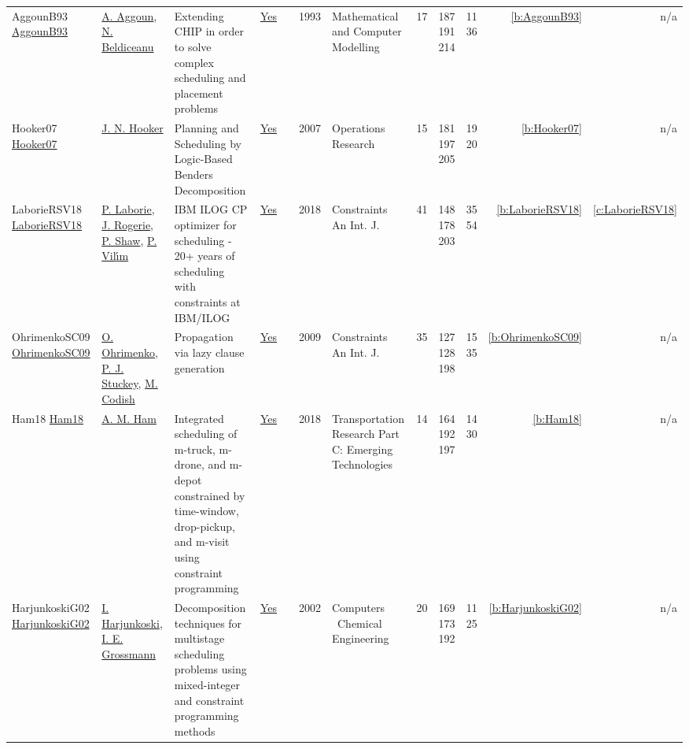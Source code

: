 {\begin{longtable}{>{\raggedright\arraybackslash}p{3cm}>{\raggedright\arraybackslash}p{4.5cm}>{\raggedright\arraybackslash}p{6.0cm}rrrp{2.5cm}rp{1cm}p{1cm}rr}
AggounB93 \href{https://www.sciencedirect.com/science/article/pii/089571779390068A}{AggounB93} & \hyperref[auth:a725]{A. Aggoun}, \hyperref[auth:a128]{N. Beldiceanu} & \cellcolor{gold!20}Extending {CHIP} in order to solve complex scheduling and placement problems & \href{../works/AggounB93.pdf}{Yes} & \cite{AggounB93} & 1993 & Mathematical and Computer Modelling & 17 & 187 191 214 & 11 36 & \ref{b:AggounB93} & n/a\\
Hooker07 \href{http://dx.doi.org/10.1287/opre.1060.0371}{Hooker07} & \hyperref[auth:a160]{J. N. Hooker} & Planning and Scheduling by Logic-Based Benders Decomposition & \href{../works/Hooker07.pdf}{Yes} & \cite{Hooker07} & 2007 & \cellcolor{red!20}Operations Research & 15 & 181 197 205 & 19 20 & \ref{b:Hooker07} & n/a\\
LaborieRSV18 \href{https://doi.org/10.1007/s10601-018-9281-x}{LaborieRSV18} & \hyperref[auth:a118]{P. Laborie}, \hyperref[auth:a119]{J. Rogerie}, \hyperref[auth:a120]{P. Shaw}, \hyperref[auth:a121]{P. Vil{\'{\i}}m} & {IBM} {ILOG} {CP} optimizer for scheduling - 20+ years of scheduling with constraints at {IBM/ILOG} & \href{../works/LaborieRSV18.pdf}{Yes} & \cite{LaborieRSV18} & 2018 & Constraints An Int. J. & 41 & 148 178 203 & 35 54 & \ref{b:LaborieRSV18} & \ref{c:LaborieRSV18}\\
OhrimenkoSC09 \href{http://dx.doi.org/10.1007/s10601-008-9064-x}{OhrimenkoSC09} & \hyperref[auth:a861]{O. Ohrimenko}, \hyperref[auth:a125]{P. J. Stuckey}, \hyperref[auth:a862]{M. Codish} & Propagation via lazy clause generation & \href{../works/OhrimenkoSC09.pdf}{Yes} & \cite{OhrimenkoSC09} & 2009 & Constraints An Int. J. & 35 & 127 128 198 & 15 35 & \ref{b:OhrimenkoSC09} & n/a\\
Ham18 \href{http://dx.doi.org/10.1016/j.trc.2018.03.025}{Ham18} & \hyperref[auth:a770]{A. M. Ham} & Integrated scheduling of m-truck, m-drone, and m-depot constrained by time-window, drop-pickup, and m-visit using constraint programming & \href{../works/Ham18.pdf}{Yes} & \cite{Ham18} & 2018 & Transportation Research Part C: Emerging Technologies & 14 & 164 192 197 & 14 30 & \ref{b:Ham18} & n/a\\
HarjunkoskiG02 \href{http://dx.doi.org/10.1016/s0098-1354(02)00100-x}{HarjunkoskiG02} & \hyperref[auth:a871]{I. Harjunkoski}, \hyperref[auth:a382]{I. E. Grossmann} & Decomposition techniques for multistage scheduling problems using mixed-integer and constraint programming methods & \href{../works/HarjunkoskiG02.pdf}{Yes} & \cite{HarjunkoskiG02} & 2002 & Computers \  Chemical Engineering & 20 & 169 173 192 & 11 25 & \ref{b:HarjunkoskiG02} & n/a\\

\end{longtable}}
